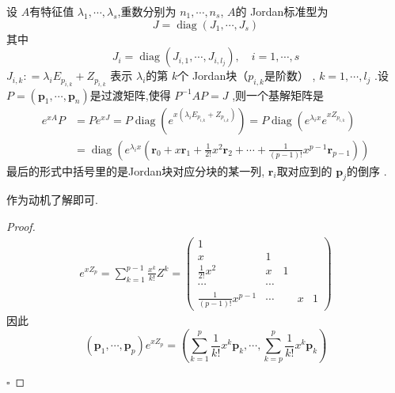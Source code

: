 \documentclass[lang=cn,12pt,color=green,fontset=none]{elegantbook}
\begin{document}
 \begin{proposition}
    设 $ A $有特征值 $  \lambda _{1},\cdots , \lambda _{s} $,重数分别为 $  n_1,\cdots,n_s  $, $ A $的 Jordan标准型为 $$
    J = \operatorname{diag}\left( J_1,\cdots ,J_{s}\right) 
    $$ 其中 $$
    J_{i} = \operatorname{diag}\left( J_{i,1},\cdots ,J_{i,l_{j}} \right)  ,\quad  i=1,\cdots ,s
    $$ $ J_{i,k} : =  \lambda_{i}E_{p_{i,k}}+ Z_{p_{i,k}}$ 表示 $  \lambda _{i} $的第 $ k $个 Jordan块（$ p_{i,k} $是阶数） , $ k=1,\cdots ,l_{j} $ .设 $ P = \left( \mathbf{p}_{1},\cdots , \mathbf{p}_{n} \right)  $是过渡矩阵,使得 $ P ^{-1}  AP=J $  ,则一个基解矩阵是 $$
    \begin{aligned}
    e^{xA}P & = Pe^{xJ} = P \operatorname{diag}\left(  e^{x \left(   \lambda _{i}E_{p_{i,k}}+ Z_{p_{i,k}}\right) }\right) = P \operatorname{diag}\left( e^{ \lambda _{i}x} e^{x Z_{p_{i,k}}} \right) \\ 
     & = \operatorname{diag}\left( e^{ \lambda _{i}x}\left( \mathbf{r}_{0}+ x \mathbf{r}_{1}+  \frac{1}{2!}x^{2} \mathbf{r}_{2}+ \cdots +  \frac{1}{\left( p-1 \right)! }x^{p-1}\mathbf{r}_{p-1} \right)  \right) 
    \end{aligned}
    $$最后的形式中括号里的是Jordan块对应分块的某一列, $ \mathbf{r}_{i} $取对应到的 $ \mathbf{p} _{j}$的倒序  .
 \end{proposition}

 \begin{remark}
    作为动机了解即可.
 \end{remark}
 \begin{proof}
    $$
    \begin{aligned}
    e^{x Z_{p}} = \sum _{k=1}^{p-1} \frac{x^{k} }{k! } Z^{k}  =\begin{pmatrix} 
        1 \\ 
         x & 1\\ 
          \frac{1}{2!}x^{2} & x & 1\\ 
           \cdots & \cdots \\ 
            \frac{1 }{ \left( p-1 \right)!  }x^{p-1} & \cdots & & x & 1 
    \end{pmatrix} 
    \end{aligned}
    $$因此 $$
   \left( \mathbf{p}_{1},\cdots ,\mathbf{p}_{p} \right)e^{xZ_{p}} =  \left( \sum _{k=1}^{p} \frac{1 }{k! }x^{k} \mathbf{p}_{k}  ,\cdots , \sum _{k=p}^{p} \frac{1}{k!}x^{k}\mathbf{p}_{k}\right)
    $$
 
    \hfill $\square$
 \end{proof}
\end{document}
